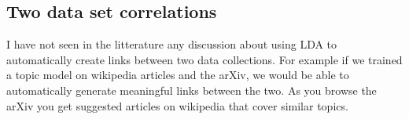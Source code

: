 \documentclass[11pt]{article}
\begin{document}

		


    \subsection{Two data set correlations}

        I have not seen in the litterature any discussion about using LDA to automatically
        create links between two data collections.
        For example if we trained a topic model on wikipedia articles and the arXiv,
        we would be able to automatically generate meaningful links between the two.
        As you browse the arXiv you get suggested articles on wikipedia that cover similar topics.

	
		
\end{document}
